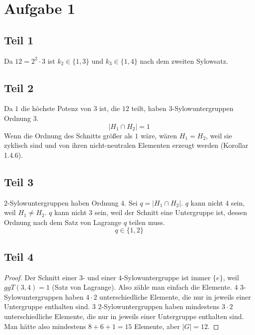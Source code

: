 \documentclass[10pt,a4paper]{article}
\begin{document}
\section{Aufgabe 1}

\subsection{Teil 1}

Da $12 = 2^{2} \cdot 3$ ist $k_{2} \in \{ 1, 3 \}$ und $k_{3} \in \{ 1, 4 \}$ nach dem zweiten Sylowsatz.

\subsection{Teil 2}

Da $1$ die höchste Potenz von $3$ ist, die $12$ teilt, haben $3$-Sylowuntergruppen Ordnung $3$.
\begin{equation}
  |H_{1} \cap H_{2}| = 1
\end{equation}
Wenn die Ordnung des Schnitts größer als $1$ wäre, wären $H_{1} = H_{2}$, weil sie zyklisch sind und von ihren nicht-neutralen Elementen erzeugt werden (Korollar 1.4.6).

\subsection{Teil 3}

$2$-Sylowuntergruppen haben Ordnung $4$.
Sei $q = |H_{1} \cap H_{2}|$.
$q$ kann nicht $4$ sein, weil $H_{1} \ne H_{2}$.
$q$ kann nicht $3$ sein, weil der Schnitt eine Untergruppe ist, dessen Ordnung nach dem Satz von Lagrange $q$ teilen muss.
\begin{equation}
  q \in \{ 1, 2 \}
\end{equation}

\subsection{Teil 4}

\begin{proof}
  Der Schnitt einer $3$- und einer $4$-Sylowuntergruppe ist immer $\{ e \}$, weil $ggT(3, 4) = 1$ (Satz von Lagrange).
  Also zähle man einfach die Elemente.
  $4$ $3$-Sylowuntergruppen haben $4 \cdot 2$ unterschiedliche Elemente, die nur in jeweils einer Untergruppe enthalten sind.
  $3$ $2$-Sylowuntergruppen haben mindestens $3 \cdot 2$ unterschiedliche Elemente, die nur in jeweils einer Untergruppe enthalten sind.
  Man hätte also mindestens $8 + 6 + 1 = 15$ Elemente, aber $|G| = 12$.
\end{proof}
\end{document}

